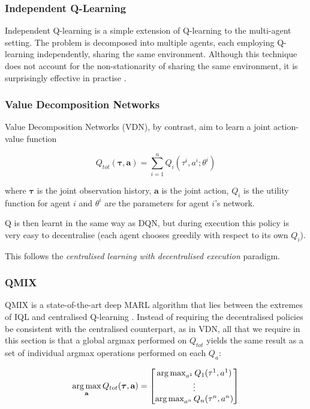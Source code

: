 \subsubsection{Independent Q-Learning}
Independent Q-learning \cite{IQL} is a simple extension of Q-learning to the multi-agent setting. The problem is decomposed into multiple agents, each employing Q-learning independently, sharing the same environment. Although this technique does not account for the non-stationarity of sharing the same environment, it is surprisingly effective in practise \cite{iqlisgood}. 


\subsubsection{Value Decomposition Networks}
Value Decomposition Networks \cite{vdn} (VDN), by contrast, aim to learn a joint action-value function

\[Q_{tot}(\boldsymbol{\tau}, \textbf{a}) = \sum_{i=1}^{n} Q_i(\tau^i,a^i;\theta^i) \]

where $\boldsymbol{\tau}$ is the joint observation history, $\textbf{a}$ is the joint action, $Q_i$ is the utility function for agent $i$ and $\theta^i$ are the parameters for agent $i$'s network.

Q is then learnt in the same way as DQN, but during execution this policy is very easy to decentralise (each agent chooses greedily with respect to its own $Q_i$).

This follows the \textit{centralised learning with decentralised execution} paradigm.

\subsubsection{QMIX}
QMIX is a state-of-the-art deep MARL algorithm that lies between the extremes of IQL and centralised Q-learning \cite{qmixcite}. Instead of requiring the decentralised policies be consistent with the centralised counterpart, as in VDN, all that we require in this section is that a global argmax performed on $Q_{tot}$ yields
the same result as a set of individual argmax operations
performed on each $Q_a$:

\[\operatorname*{arg\,max}_{\textbf{a}}Q_{tot}(\boldsymbol{\tau},\textbf{a}) = \begin{bmatrix}
        \operatorname*{arg\,max}_{a^1}Q_1(\tau^1,a^1) \\
        \vdots\\
        \operatorname*{arg\,max}_{a^n}Q_n(\tau^n,a^n)
    \end{bmatrix}\]







